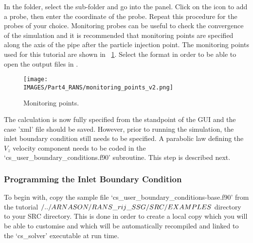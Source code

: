 In the  folder, select the  sub-folder and go into the  panel.  Click on the \keys{$+$} icon to add a probe, then enter the coordinate of the probe.  Repeat this procedure for the probes of your choice.  Monitoring probes can be useful to check the convergence of the simulation and it is recommended that monitoring points are specified along the axis of the pipe after the particle injection point.  The monitoring points used for this tutorial are shown in \figurename~\ref{lag:monitoring}. Select the  format in order to be able to open the output files in \paravis.
%
\begin{figure}[H]
\centering
\texttt{[image: \\IMAGES/Part4\_RANS/monitoring\_points\_v2.png]}
\caption{Monitoring points.}\label{lag:monitoring}
\end{figure}
%
The \CS calculation is now fully specified from the standpoint of the GUI and the \CS case 'xml' file should be saved.  However, prior to running the simulation, the inlet boundary condition still needs to be specified.  A parabolic law defining the $V_z$ velocity component needs to be coded in the ‘cs\_user\_boundary\_conditions.f90’ subroutine.  This step is described next.

\subsubsection{Programming the Inlet Boundary Condition}\label{lag:code_inlet}

To begin with, copy the sample file ‘cs\_user\_boundary\_conditions-base.f90’ from the tutorial $/../ARNASON/\\RANS\_rij\_SSG/SRC/EXAMPLES$ directory to your SRC directory.  This is done in order to create a local copy which you will be able to customise and which will be automatically recompiled and linked to the ‘cs\_solver’ executable at run time.

